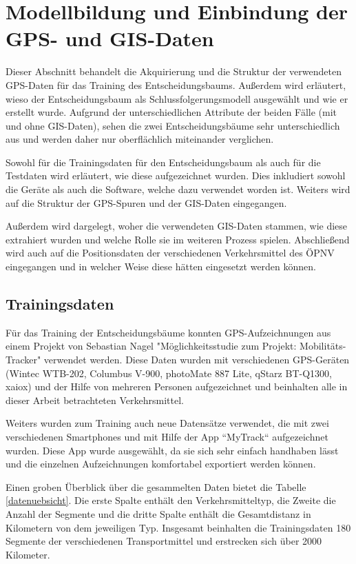 \chapter{Modellbildung und Einbindung der GPS- und GIS-Daten}
Dieser Abschnitt behandelt die Akquirierung und die Struktur der verwendeten GPS-Daten für das Training des Entscheidungsbaums. Außerdem wird erläutert, wieso der Entscheidungsbaum als Schlussfolgerungsmodell ausgewählt und wie er erstellt wurde. Aufgrund der unterschiedlichen Attribute  der beiden Fälle (mit und ohne GIS-Daten), sehen die zwei Entscheidungsbäume sehr unterschiedlich aus und werden daher nur oberflächlich miteinander verglichen.

Sowohl für die Trainingsdaten für den Entscheidungsbaum als auch für die Testdaten wird erläutert, wie diese aufgezeichnet wurden. Dies inkludiert sowohl die Geräte als auch die Software, welche dazu verwendet worden ist. Weiters wird auf die Struktur der GPS-Spuren und der GIS-Daten eingegangen.

Außerdem wird dargelegt, woher die verwendeten GIS-Daten stammen, wie diese extrahiert wurden und welche Rolle sie im weiteren Prozess spielen. Abschließend wird auch auf die Positionsdaten der verschiedenen Verkehrsmittel des ÖPNV eingegangen und in welcher Weise diese hätten eingesetzt werden können.
\clearpage

\section{Trainingsdaten}
\label{sec:trainingdata}
Für das Training der Entscheidungsbäume konnten GPS-Aufzeichnungen aus einem Projekt von Sebastian Nagel "Möglichkeitsstudie zum Projekt: Mobilitäts-Tracker" verwendet werden. Diese Daten wurden mit verschiedenen GPS-Geräten (Wintec WTB-202, Columbus V-900, photoMate 887 Lite, qStarz BT-Q1300, xaiox) und der Hilfe von mehreren Personen aufgezeichnet und beinhalten alle in dieser Arbeit betrachteten Verkehrsmittel. \cite{sebastian_nagel_moglichkeitsstudie_2011}

Weiters wurden zum Training auch neue Datensätze verwendet, die mit zwei verschiedenen Smartphones und mit Hilfe der App ``MyTrack`` aufgezeichnet wurden. Diese App wurde ausgewählt, da sie sich sehr einfach handhaben lässt und die einzelnen Aufzeichnungen komfortabel exportiert werden können. 

Einen groben Überblick über die gesammelten Daten bietet die Tabelle \ref{datenuebsicht}. Die erste Spalte enthält den Verkehrsmitteltyp, die Zweite die Anzahl der Segmente  und die dritte Spalte enthält die Gesamtdistanz in Kilometern von dem jeweiligen Typ. Insgesamt beinhalten die Trainingsdaten 180 Segmente der verschiedenen Transportmittel und erstrecken sich über 2000 Kilometer.

